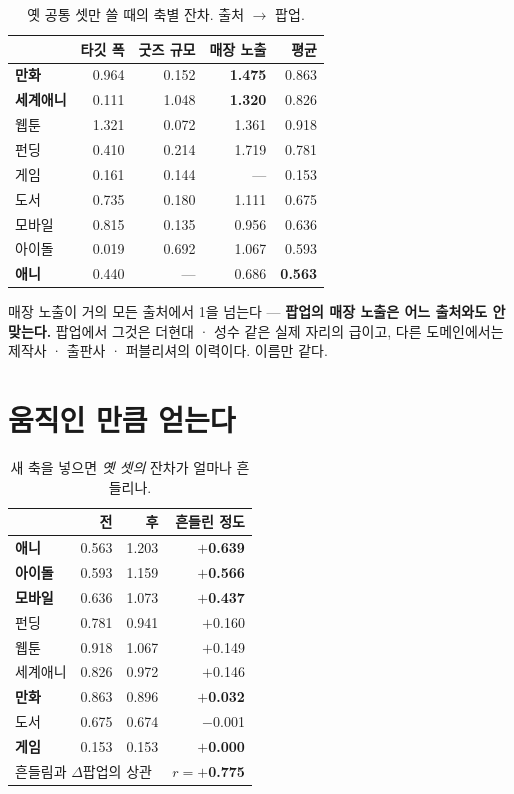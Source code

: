 \documentclass[10pt]{article}
\begin{document}
\begin{table}[t]
\centering\tsize
\caption{옛 공통 셋만 쓸 때의 축별 잔차. 출처 $\to$ 팝업.}
\begin{tabular}{lrrrr}
\toprule
& 타깃 폭 & 굿즈 규모 & 매장 노출 & 평균 \\
\midrule
\textbf{만화} & 0.964 & 0.152 & \textbf{1.475} & 0.863 \\
\textbf{세계애니} & 0.111 & 1.048 & \textbf{1.320} & 0.826 \\
웹툰 & 1.321 & 0.072 & 1.361 & 0.918 \\
펀딩 & 0.410 & 0.214 & 1.719 & 0.781 \\
게임 & 0.161 & 0.144 & --- & 0.153 \\
도서 & 0.735 & 0.180 & 1.111 & 0.675 \\
모바일 & 0.815 & 0.135 & 0.956 & 0.636 \\
아이돌 & 0.019 & 0.692 & 1.067 & 0.593 \\
\textbf{애니} & 0.440 & --- & 0.686 & \textbf{0.563} \\
\bottomrule
\end{tabular}
\end{table}

매장 노출이 거의 모든 출처에서 1을 넘는다 --- \textbf{팝업의 매장 노출은
어느 출처와도 안 맞는다.} 팝업에서 그것은 더현대 · 성수 같은 실제 자리의
급이고, 다른 도메인에서는 제작사 · 출판사 · 퍼블리셔의 이력이다. 이름만 같다.

\section{움직인 만큼 얻는다}

\begin{table}[t]
\centering\tsize
\caption{새 축을 넣으면 \emph{옛 셋의} 잔차가 얼마나 흔들리나.}
\begin{tabular}{lrrr}
\toprule
& 전 & 후 & 흔들린 정도 \\
\midrule
\textbf{애니} & 0.563 & 1.203 & \textbf{$+$0.639} \\
\textbf{아이돌} & 0.593 & 1.159 & \textbf{$+$0.566} \\
\textbf{모바일} & 0.636 & 1.073 & \textbf{$+$0.437} \\
펀딩 & 0.781 & 0.941 & $+$0.160 \\
웹툰 & 0.918 & 1.067 & $+$0.149 \\
세계애니 & 0.826 & 0.972 & $+$0.146 \\
\textbf{만화} & 0.863 & 0.896 & \textbf{$+$0.032} \\
도서 & 0.675 & 0.674 & $-$0.001 \\
\textbf{게임} & 0.153 & 0.153 & \textbf{$+$0.000} \\
\midrule
\multicolumn{3}{l}{흔들림과 $\Delta$팝업의 상관} & \textbf{$r{=}+$0.775} \\
\bottomrule
\end{tabular}
\end{table}
\end{document}
